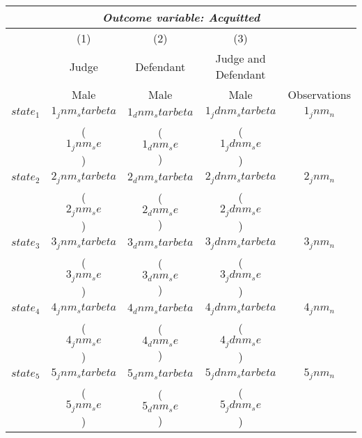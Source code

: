 {
\def\sym#1{\ifmmode^{#1}\else\(^{#1}\)\fi}
\begin{tabular}{l*{4}{c}}
  \hline\hline
\multicolumn{5}{c}{\textit{Outcome variable: Acquitted}}\\
\hline
&\multicolumn{1}{c}{(1)}&\multicolumn{1}{c}{(2)}&\multicolumn{1}{c}{(3)} &\multicolumn{1}{c}{}\\

\hspace{15mm}& Judge & Defendant & Judge and Defendant  \\

\hspace{15mm}& Male & Male & Male  & Observations  \\
\hline 

$$state_1$$ \hspace{15mm} & $$1_jnm_starbeta$$ & $$1_dnm_starbeta$$ & $$1_jdnm_starbeta$$ & $$1_jnm_n$$ \\
                          & ($$1_jnm_se$$)     & ($$1_dnm_se$$)     & ($$1_jdnm_se$$)                   \\[2.5mm]
\hline 

$$state_2$$ \hspace{15mm} & $$2_jnm_starbeta$$ & $$2_dnm_starbeta$$ & $$2_jdnm_starbeta$$ & $$2_jnm_n$$ \\
                          & ($$2_jnm_se$$)     & ($$2_dnm_se$$)     & ($$2_jdnm_se$$)                   \\[2.5mm]
\hline 

$$state_3$$ \hspace{15mm} & $$3_jnm_starbeta$$ & $$3_dnm_starbeta$$ & $$3_jdnm_starbeta$$ & $$3_jnm_n$$ \\
                          & ($$3_jnm_se$$)     & ($$3_dnm_se$$)     & ($$3_jdnm_se$$)                   \\[2.5mm]
\hline

$$state_4$$ \hspace{15mm} & $$4_jnm_starbeta$$ & $$4_dnm_starbeta$$ & $$4_jdnm_starbeta$$ & $$4_jnm_n$$ \\
                          & ($$4_jnm_se$$)     & ($$4_dnm_se$$)     & ($$4_jdnm_se$$)                   \\[2.5mm]
\hline

$$state_5$$ \hspace{15mm} & $$5_jnm_starbeta$$ & $$5_dnm_starbeta$$ & $$5_jdnm_starbeta$$ & $$5_jnm_n$$ \\
                          & ($$5_jnm_se$$)     & ($$5_dnm_se$$)     & ($$5_jdnm_se$$)                   \\[2.5mm]
\hline


\end{tabular}}
